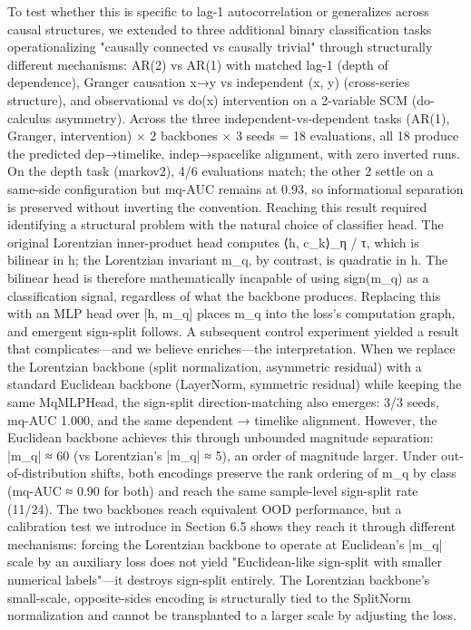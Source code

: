 To test whether this is specific to lag-1 autocorrelation or generalizes across causal structures, we extended to three additional binary classification tasks operationalizing "causally connected vs causally trivial" through structurally different mechanisms: AR(2) vs AR(1) with matched lag-1 (depth of dependence), Granger causation x→y vs independent (x, y) (cross-series structure), and observational vs do(x) intervention on a 2-variable SCM (do-calculus asymmetry). Across the three independent-vs-dependent tasks (AR(1), Granger, intervention) × 2 backbones × 3 seeds = 18 evaluations, all 18 produce the predicted dep→timelike, indep→spacelike alignment, with zero inverted runs. On the depth task (markov2), 4/6 evaluations match; the other 2 settle on a same-side configuration but mq-AUC remains at 0.93, so informational separation is preserved without inverting the convention.
Reaching this result required identifying a structural problem with the natural choice of classifier head. The original Lorentzian inner-product head computes ⟨h, c_k⟩_η / τ, which is bilinear in h; the Lorentzian invariant m_q, by contrast, is quadratic in h. The bilinear head is therefore mathematically incapable of using sign(m_q) as a classification signal, regardless of what the backbone produces. Replacing this with an MLP head over [h, m_q] places m_q into the loss's computation graph, and emergent sign-split follows.
A subsequent control experiment yielded a result that complicates—and we believe enriches—the interpretation. When we replace the Lorentzian backbone (split normalization, asymmetric residual) with a standard Euclidean backbone (LayerNorm, symmetric residual) while keeping the same MqMLPHead, the sign-split direction-matching also emerges: 3/3 seeds, mq-AUC 1.000, and the same dependent → timelike alignment. However, the Euclidean backbone achieves this through unbounded magnitude separation: |m_q| ≈ 60 (vs Lorentzian's |m_q| ≈ 5), an order of magnitude larger. Under out-of-distribution shifts, both encodings preserve the rank ordering of m_q by class (mq-AUC ≈ 0.90 for both) and reach the same sample-level sign-split rate (11/24). The two backbones reach equivalent OOD performance, but a calibration test we introduce in Section 6.5 shows they reach it through different mechanisms: forcing the Lorentzian backbone to operate at Euclidean's |m_q| scale by an auxiliary loss does not yield "Euclidean-like sign-split with smaller numerical labels"—it destroys sign-split entirely. The Lorentzian backbone's small-scale, opposite-sides encoding is structurally tied to the SplitNorm normalization and cannot be transplanted to a larger scale by adjusting the loss.
